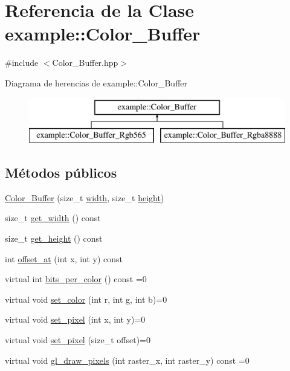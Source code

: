 \hypertarget{classexample_1_1_color___buffer}{}\section{Referencia de la Clase example\+::Color\+\_\+\+Buffer}
\label{classexample_1_1_color___buffer}


{\ttfamily \#include $<$Color\+\_\+\+Buffer.\+hpp$>$}

Diagrama de herencias de example\+::Color\+\_\+\+Buffer\begin{figure}[H]
\begin{center}
\leavevmode
\includegraphics[height=2.000000cm]{classexample_1_1_color___buffer}
\end{center}
\end{figure}
\subsection*{Métodos públicos}
\begin{DoxyCompactItemize}
\item 
\mbox{\hyperlink{classexample_1_1_color___buffer_a44c19770a14b0f8e46e7ceda1df5fc3d}{Color\+\_\+\+Buffer}} (size\+\_\+t \mbox{\hyperlink{classexample_1_1_color___buffer_ab61454d4b35cbba00d2e634d14ed20ac}{width}}, size\+\_\+t \mbox{\hyperlink{classexample_1_1_color___buffer_ae01f4538ee30af1d3072a425c5ad37ac}{height}})
\item 
size\+\_\+t \mbox{\hyperlink{classexample_1_1_color___buffer_a0bbc4a120bc04b512e303baf8330ff82}{get\+\_\+width}} () const
\item 
size\+\_\+t \mbox{\hyperlink{classexample_1_1_color___buffer_a4d1495a260205b83e1bd28dd04c6eda2}{get\+\_\+height}} () const
\item 
int \mbox{\hyperlink{classexample_1_1_color___buffer_ae316a2df43a9ead02cc45170a8d0f7ed}{offset\+\_\+at}} (int x, int y) const
\item 
virtual int \mbox{\hyperlink{classexample_1_1_color___buffer_a76463553dc782f2dc24a61bec708e273}{bits\+\_\+per\+\_\+color}} () const =0
\item 
virtual void \mbox{\hyperlink{classexample_1_1_color___buffer_a3fbfa949ee340ccdb40ad0ce8339b827}{set\+\_\+color}} (int r, int g, int b)=0
\item 
virtual void \mbox{\hyperlink{classexample_1_1_color___buffer_a967ea326ec0889a36db523727a8154b5}{set\+\_\+pixel}} (int x, int y)=0
\item 
virtual void \mbox{\hyperlink{classexample_1_1_color___buffer_a1c919e629ef74e418e1ad416d0a5e85a}{set\+\_\+pixel}} (size\+\_\+t offset)=0
\item 
virtual void \mbox{\hyperlink{classexample_1_1_color___buffer_a793b667028b2eb7efde2cee76066eac7}{gl\+\_\+draw\+\_\+pixels}} (int raster\+\_\+x, int raster\+\_\+y) const =0
\end{DoxyCompactItemize}

